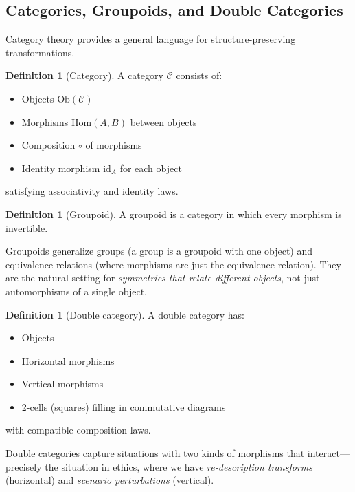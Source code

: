\documentclass[12pt,letterpaper]{article}
\theoremstyle{definition}
\newtheorem{definition}[theorem]{Definition}
\theoremstyle{remark}
\begin{document}
\subsection{Categories, Groupoids, and Double Categories}

Category theory provides a general language for structure-preserving transformations.

\begin{definition}[Category]
A category $\mathcal{C}$ consists of:
\begin{itemize}
    \item Objects $\text{Ob}(\mathcal{C})$
    \item Morphisms $\text{Hom}(A, B)$ between objects
    \item Composition $\circ$ of morphisms
    \item Identity morphism $\text{id}_A$ for each object
\end{itemize}
satisfying associativity and identity laws.
\end{definition}

\begin{definition}[Groupoid]
A groupoid is a category in which every morphism is invertible.
\end{definition}

Groupoids generalize groups (a group is a groupoid with one object) and equivalence relations (where morphisms are just the equivalence relation). They are the natural setting for \textit{symmetries that relate different objects}, not just automorphisms of a single object.

\begin{definition}[Double category]
A double category has:
\begin{itemize}
    \item Objects
    \item Horizontal morphisms
    \item Vertical morphisms
    \item 2-cells (squares) filling in commutative diagrams
\end{itemize}
with compatible composition laws.
\end{definition}

Double categories capture situations with two kinds of morphisms that interact---precisely the situation in ethics, where we have \textit{re-description transforms} (horizontal) and \textit{scenario perturbations} (vertical).

\end{document}
